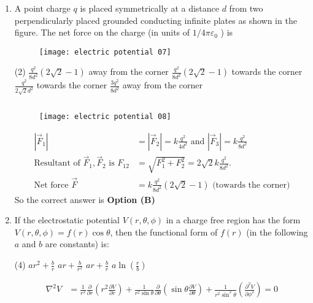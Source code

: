 \begin{enumerate}
	\item A point charge $q$ is placed symmetrically at a distance $d$ from two perpendicularly placed grounded conducting infinite plates as shown in the figure. The net force on the charge (in units of $1 / 4 \pi \varepsilon_{0}$ ) is
	{}
	\begin{figure}[H]
		\centering
		\texttt{[image: electric potential 07]}
	\end{figure}
	\begin{tasks}(2)
		\task[\textbf{A.}] $\frac{q^{2}}{8 d^{2}}(2 \sqrt{2}-1)$ away from the corner
		\task[\textbf{B.}] $\frac{q^{2}}{8 d^{2}}(2 \sqrt{2}-1)$ towards the corner
		\task[\textbf{C.}] $\frac{q^{2}}{2 \sqrt{2} d^{2}}$ towards the corner
		\task[\textbf{D.}] $\frac{3 q^{2}}{8 d^{2}}$ away from the corner
	\end{tasks}
	\begin{answer}$\left. \right. $
		\begin{figure}[H]
			\centering
			\texttt{[image: electric potential 08]}
		\end{figure}
		\begin{align*}
		\left|\vec{F}_{1}\right|&=\left|\vec{F}_{2}\right|=k \frac{q^{2}}{4 d^{2}} \text{ and } \left|\vec{F}_{3}\right|=k \frac{q^{2}}{8 d^{2}}\\
		\text{Resultant of }\vec{F}_{1}, \vec{F}_{2}\text{ is }F_{12}&=\sqrt{F_{1}^{2}+F_{2}^{2}}=2 \sqrt{2} k \frac{q^{2}}{8 d^{2}}.\\
		\text{Net force }\vec{F}&=k \frac{q^{2}}{8 d^{2}}(2 \sqrt{2}-1)\text{ (towards the corner)}
		\end{align*}
		So the correct answer is \textbf{Option (B)}
	\end{answer}
	\item If the electrostatic potential $V(r, \theta, \phi)$ in a charge free region has the form $V(r, \theta, \phi)=f(r) \cos \theta$, then the functional form of $f(r)$ (in the following $a$ and $b$ are constants) is:
	{}
	\begin{tasks}(4)
		\task[\textbf{A.}] $a r^{2}+\frac{b}{r}$
		\task[\textbf{B.}] $a r+\frac{b}{r^{2}}$
		\task[\textbf{C.}] $a r+\frac{b}{r}$
		\task[\textbf{D.}] $a \ln \left(\frac{r}{b}\right)$
	\end{tasks}
	\begin{answer}
		\begin{align*}
		\nabla^{2} V&=\frac{1}{r^{2}} \frac{\partial}{\partial r}\left(r^{2} \frac{\partial V}{\partial r}\right)+\frac{1}{r^{2} \sin \theta} \frac{\partial}{\partial \theta}\left(\sin \theta \frac{\partial V}{\partial \theta}\right)+\frac{1}{r^{2} \sin ^{2} \theta}\left(\frac{\partial^{2} V}{\partial \phi^{2}}\right)=0\\

\end{align*}
\end{answer}
\end{enumerate}
